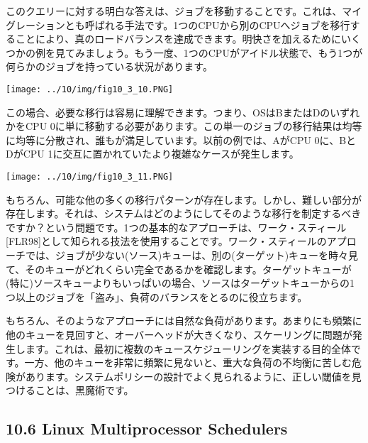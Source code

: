 このクエリーに対する明白な答えは、ジョブを移動することです。これは、マイグレーションとも呼ばれる手法です。1つのCPUから別のCPUへジョブを移行することにより、真のロードバランスを達成できます。明快さを加えるためにいくつかの例を見てみましょう。もう一度、1つのCPUがアイドル状態で、もう1つが何らかのジョブを持っている状況があります。

\texttt{[image: ../10/img/fig10\_3\_10.PNG]}

この場合、必要な移行は容易に理解できます。つまり、OSはBまたはDのいずれかをCPU
0に単に移動する必要があります。この単一のジョブの移行結果は均等に均等に分散され、誰もが満足しています。以前の例では、AがCPU
0に、BとDがCPU 1に交互に置かれていたより複雑なケースが発生します。

\texttt{[image: ../10/img/fig10\_3\_11.PNG]}

もちろん、可能な他の多くの移行パターンが存在します。しかし、難しい部分が存在します。それは、システムはどのようにしてそのような移行を制定するべきですか？という問題です。1つの基本的なアプローチは、ワーク・スティール{[}FLR98{]}として知られる技法を使用することです。ワーク・スティールのアプローチでは、ジョブが少ない(ソース)キューは、別の(ターゲット)キューを時々見て、そのキューがどれくらい完全であるかを確認します。ターゲットキューが(特に)ソースキューよりもいっぱいの場合、ソースはターゲットキューからの1つ以上のジョブを「盗み」、負荷のバランスをとるのに役立ちます。

もちろん、そのようなアプローチには自然な負荷があります。あまりにも頻繁に他のキューを見回すと、オーバーヘッドが大きくなり、スケーリングに問題が発生します。これは、最初に複数のキュースケジューリングを実装する目的全体です。一方、他のキューを非常に頻繁に見ないと、重大な負荷の不均衡に苦しむ危険があります。システムポリシーの設計でよく見られるように、正しい閾値を見つけることは、黒魔術です。

\hypertarget{linux-multiprocessor-schedulers}{%
\subsection*{10.6 Linux Multiprocessor
Schedulers}\label{linux-multiprocessor-schedulers}}

